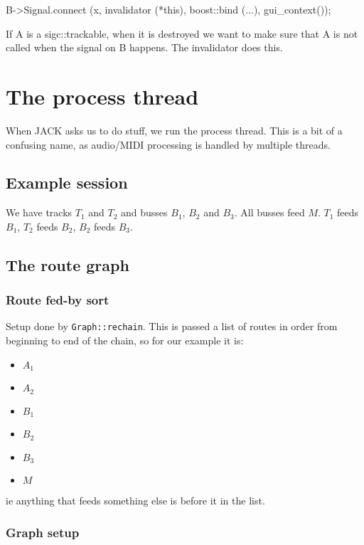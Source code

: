 \documentclass[10pt,a4paper]{book}
\newcommand{\code}[1]{\texttt{#1}}
\begin{document}
B->Signal.connect (x, invalidator (*this), boost::bind (...), gui\_context());

If A is a sigc::trackable, when it is destroyed we want to make sure that
A is not called when the signal on B happens.  The invalidator does this.




\chapter{The process thread}

When JACK asks us to do stuff, we run the process thread.  This is a
bit of a confusing name, as audio/MIDI processing is handled by
multiple threads.

\section{Example session}

We have tracks $T_1$ and $T_2$ and busses $B_1$, $B_2$ and $B_3$.  All
busses feed $M$.  $T_1$ feeds $B_1$, $T_2$ feeds $B_2$, $B_2$ feeds
$B_3$.


\section{The route graph}

\subsection{Route fed-by sort}

Setup done by \code{Graph::rechain}.  This is passed a list of routes
in order from beginning to end of the chain, so for our example it is:

\begin{itemize}
\item $A_1$
\item $A_2$
\item $B_1$
\item $B_2$
\item $B_3$
\item $M$
\end{itemize}

ie anything that feeds something else is before it in the list.

\subsection{Graph setup}
\end{document}
